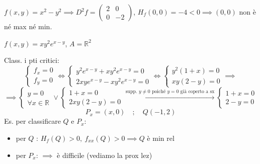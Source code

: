 \begin{example}
$f(x, y) = x^2 - y^2 \implies D^2 f = \begin{pmatrix} 2 & 0 \\ 0 & -2 \end{pmatrix}$, \quad $H_f(0, 0) = -4 < 0 \implies (0, 0)$ non è né max né min.
\end{example}

\begin{esercizio}
$f(x, y) = x y^2 e^{x - y}$, \qquad $A = \mathbb{R}^2$

Class. i pti critici:
\[
\begin{cases}
f_x = 0 \\
f_y = 0
\end{cases}
\iff
\begin{cases}
y^2 e^{x - y} + x y^2 e^{x - y} = 0 \\
2xy e^{x - y} - x y^2 e^{x - y} = 0
\end{cases}
\iff
\begin{cases}
y^2 (1 + x) = 0 \\
xy (2 - y) = 0
\end{cases}
\implies
\]
\[
\implies
\begin{cases}
y = 0 \\
\forall x \in \mathbb{R}
\end{cases}
\lor
\begin{cases}
1 + x = 0 \\
2xy (2 - y) = 0
\end{cases}
\xrightarrow{\text{supp. } y \neq 0 \text{ poiché } y = 0 \text{ già coperto a sx}}
\begin{cases}
1 + x = 0 \\
2 - y = 0
\end{cases}
\]
\[
P_x = (x, 0) \quad ; \quad Q(-1, 2)
\]
Es. per classificare $Q$ e $P_x$:
\begin{itemize}
    \item per $Q$ : $H_f(Q) > 0, \ f_{xx}(Q) > 0 \implies Q$ è min rel
    \item per $P_x$: $\implies$ è difficile (vediamo la prox lez)
\end{itemize}
\end{esercizio}

